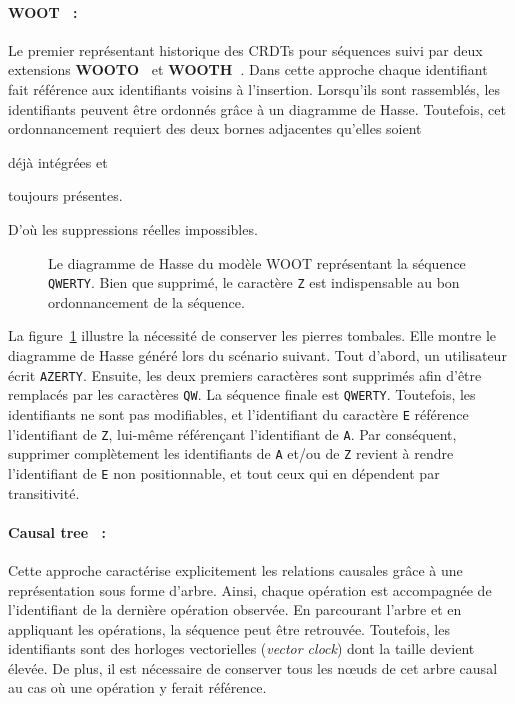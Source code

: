 \paragraph{WOOT~\cite{oster2006data} :} Le premier représentant historique des
CRDTs pour séquences suivi par deux extensions
\textbf{WOOTO~\cite{weiss2007wooki}} et
\textbf{WOOTH~\cite{ahmed2011evaluating}}. Dans cette approche chaque
identifiant fait référence aux identifiants voisins à l'insertion.  Lorsqu'ils
sont rassemblés, les identifiants peuvent être ordonnés grâce à un diagramme de
Hasse. Toutefois, cet ordonnancement requiert des deux bornes adjacentes
qu'elles soient
\begin{inparaenum}[(i)]
\item déjà intégrées et
\item toujours présentes.
\end{inparaenum}
D'où les suppressions réelles impossibles.

\begin{figure}
  \centering
  
  \caption[Diagramme de Hasse dans WOOT]
  {\label{repl:fig:wootexample}Le diagramme de Hasse du modèle WOOT représentant
    la séquence \texttt{QWERTY}. Bien que supprimé, le caractère \texttt{Z} est
    indispensable au bon ordonnancement de la séquence.}
\end{figure}

\noindent La figure~\ref{repl:fig:wootexample} illustre la nécessité de
conserver les pierres tombales. Elle montre le diagramme de Hasse généré lors du
scénario suivant. Tout d'abord, un utilisateur écrit \texttt{AZERTY}. Ensuite,
les deux premiers caractères sont supprimés afin d'être remplacés par les
caractères \texttt{QW}. La séquence finale est \texttt{QWERTY}. Toutefois, les
identifiants ne sont pas modifiables, et l'identifiant du caractère \texttt{E}
référence l'identifiant de \texttt{Z}, lui-même référençant l'identifiant de
\texttt{A}. Par conséquent, supprimer complètement les identifiants de
\texttt{A} et/ou de \texttt{Z} revient à rendre l'identifiant de \texttt{E} non
positionnable, et tout ceux qui en dépendent par transitivité.

\paragraph{Causal tree~\cite{grishchenko2010deep} :} Cette approche caractérise
explicitement les relations causales grâce à une représentation sous forme
d'arbre. Ainsi, chaque opération est accompagnée de l'identifiant de la dernière
opération observée. En parcourant l'arbre et en appliquant les opérations, la
séquence peut être retrouvée. Toutefois, les identifiants sont des horloges
vectorielles (\emph{vector clock}) dont la taille devient élevée. De plus, il
est nécessaire de conserver tous les nœuds de cet arbre causal au cas où une
opération y ferait référence.

